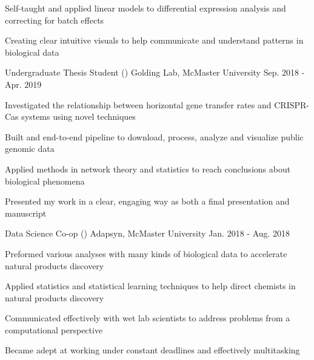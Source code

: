 \begin{cventries}
{\begin{cvitems}
         \item {Self-taught and applied linear models to differential expression analysis and correcting for batch effects}
         \item {Creating clear intuitive visuals to help communicate and understand patterns in biological data}
        \end{cvitems}
      }
   \cventry
     {Undergraduate Thesis Student ()}
     {Golding Lab, McMaster University}
     {Sep. 2018 - Apr. 2019}
     {}%
     {
       \begin{cvitems}
        \item {Investigated the relationship between horizontal gene transfer rates and CRISPR-Cas systems using novel techniques}
        \item {Built and end-to-end pipeline to download, process, analyze and visualize public genomic data}
        \item {Applied methods in network theory and statistics to reach conclusions about biological phenomena}
        \item {Presented my work in a clear, engaging way as both a final presentation and manuscript}
       \end{cvitems}
     }
    \cventry
      {Data Science Co-op ()}
      {Adapsyn, McMaster University}
      {Jan. 2018 - Aug. 2018}
      {}%
      {
        \begin{cvitems}
         \item {Preformed various analyses with many kinds of biological data to accelerate natural products discovery}
         \item {Applied statistics and statistical learning techniques to help direct chemists in natural products discovery}
         \item {Communicated effectively with wet lab scientists to address problems from a computational perspective}
         \item {Became adept at working under constant deadlines and effectively multitasking}
        \end{cvitems}
      }

\end{cventries}
